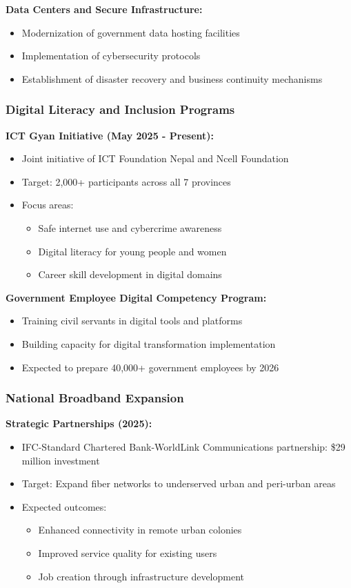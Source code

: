 \documentclass[12pt,a4paper]{article}
\begin{document}
\textbf{Data Centers and Secure Infrastructure:}
\begin{itemize}
    \item Modernization of government data hosting facilities
    \item Implementation of cybersecurity protocols
    \item Establishment of disaster recovery and business continuity mechanisms
\end{itemize}

\subsubsection{Digital Literacy and Inclusion Programs}

\textbf{ICT Gyan Initiative (May 2025 - Present):}
\begin{itemize}
    \item Joint initiative of ICT Foundation Nepal and Ncell Foundation
    \item Target: 2,000+ participants across all 7 provinces
    \item Focus areas:
    \begin{itemize}
        \item Safe internet use and cybercrime awareness
        \item Digital literacy for young people and women
        \item Career skill development in digital domains
    \end{itemize}
\end{itemize}

\textbf{Government Employee Digital Competency Program:}
\begin{itemize}
    \item Training civil servants in digital tools and platforms
    \item Building capacity for digital transformation implementation
    \item Expected to prepare 40,000+ government employees by 2026
\end{itemize}

\subsubsection{National Broadband Expansion}

\textbf{Strategic Partnerships (2025):}
\begin{itemize}
    \item IFC-Standard Chartered Bank-WorldLink Communications partnership: \$29 million investment
    \item Target: Expand fiber networks to underserved urban and peri-urban areas
    \item Expected outcomes:
    \begin{itemize}
        \item Enhanced connectivity in remote urban colonies
        \item Improved service quality for existing users
        \item Job creation through infrastructure development
    \end{itemize}
\end{itemize}
\end{document}

